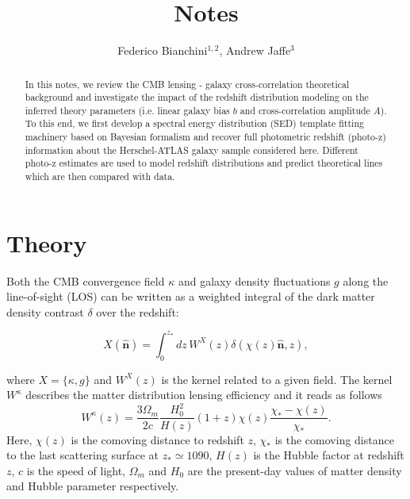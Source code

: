 \documentclass[prd,showpacs,amsfonts,amssymb,amsmath, nofootinbib]{revtex4-1}
\newcommand{\nver}{\hat{\mathbf{n}}}
\begin{document}
 
\title{Notes}

\author{Federico Bianchini$^{1,2}$, Andrew Jaffe$^{3}$}


\begin{abstract}
In this notes, we review the CMB lensing - galaxy cross-correlation theoretical background and investigate  the impact of the redshift distribution modeling on the inferred theory parameters (i.e. linear galaxy bias $b$ and cross-correlation amplitude $A$). To this end, we first develop a spectral energy distribution (SED) template fitting machinery based on Bayesian formalism and recover full photometric redshift (photo-z) information about the Herschel-ATLAS galaxy sample considered here. Different photo-z estimates are used to model redshift distributions and predict theoretical lines which are then compared with data.
 
\end{abstract}


\maketitle


\section{Theory}
\label{sec:theory}

Both the CMB convergence field $\kappa$ and galaxy density fluctuations $g$ along the line-of-sight (LOS) can be written as a weighted integral of the dark matter density contrast $\delta$ over the redshift:

\begin{equation}
X(\nver) = \int_0^{z_*} dz\, W^X(z)\delta(\chi(z)\nver,z),
\end{equation}

where $X=\{\kappa,g\}$ and $W^X(z)$ is the kernel related to a given field.
The kernel $W^{\kappa}$ describes the matter distribution lensing efficiency and it reads as follows
%
\begin{equation}
W^{\kappa}(z) = \frac{3\Omega_m}{2c}\frac{H_0^2}{H(z)}(1+z)\chi(z)\frac{\chi_*-\chi(z)}{\chi_*}.
\end{equation}
%
Here, $\chi(z)$ is the comoving distance to redshift $z$, $\chi_*$ is the comoving distance to the last scattering surface at $z_*\simeq 1090$, $H(z)$ is the Hubble factor at redshift $z$, $c$ is the speed of light, $\Omega_m$ and $H_0$ are the present-day values of matter density and Hubble parameter respectively.
\end{document}
